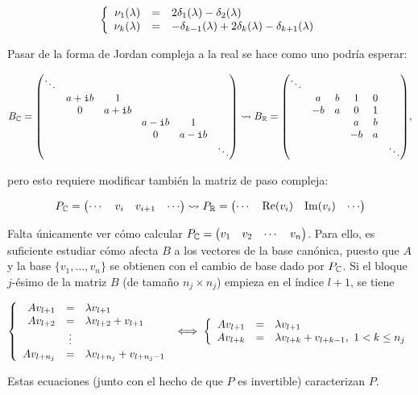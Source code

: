 \documentclass[../ecuaciones_diferenciales.tex]{subfiles}
\begin{document}
\[\left\{
	\begin{array}[ht]{r c l}
		\nu_1(\lambda) & = & 2\delta_1(\lambda) - \delta_2(\lambda)                              \\
		\nu_k(\lambda) & = & -\delta_{k-1}(\lambda) + 2\delta_k(\lambda) - \delta_{k+1}(\lambda)
	\end{array}
	\right.
\]

Pasar de la forma de Jordan compleja a la real se hace como uno podría
esperar:

\[B_\Complex =
	\mat{\ddots &      &      &      &      &         \\
		& a + \iu b & 1    &      &      &         \\
		& 0    & a + \iu b &      &      &         \\
		&      &      & a - \iu b & 1    &         \\
		&      &      & 0    & a - \iu b &         \\
		&      &      &      &      & \ddots} \leadsto
	B_\R =
	\mat{\ddots &    &   &    &      &         \\
		& a  & b & 1  & 0 &         \\
		& -b & a & 0  & 1 &         \\
		&    &   & a  & b &         \\
		&    &   & -b & a &         \\
		&    &   &    &   & \ddots},
\]

pero esto requiere modificar también la matriz de paso compleja:

\[P_{\mathbb{C}} =
	\begin{pmatrix}\cdots & v_i & v_{i+1} & \cdots\end{pmatrix} \leadsto
	P_{\mathbb{R}} =
	\begin{pmatrix}\cdots & \mathrm{Re}(v_i) & \mathrm{Im}(v_i) & \cdots\end{pmatrix}\]

Falta únicamente ver cómo calcular
\(P_{\mathbb{C}} = \begin{pmatrix}v_1 & v_2 & \cdots & v_n\end{pmatrix}\). Para ello, es suficiente
estudiar cómo afecta \(B\) a los vectores de la base canónica, puesto que
\(A\) y la base \(\{v_1, \dots, v_n\}\) se obtienen con el cambio de
base dado por \(P_{\mathbb{C}}\). Si el bloque \(j\)-ésimo de la matriz \(B\) (de
tamaño \(n_j \times n_j\)) empieza en el índice \(l+1\), se tiene

\[\left\{
	\begin{array}[ht]{r c l}
		Av_{l+1}    & =      & \lambda v_{l+1}                 \\
		Av_{l+2}    & =      & \lambda v_{l+2} + v_{l+1}       \\
		            & \vdots &                                 \\
		A v_{l+n_j} & =      & \lambda v_{l+n_j} + v_{l+n_j-1}
	\end{array} \right. \iff
	\left\{
	\begin{array}[ht]{r c l}
		Av_{l+1} & = & \lambda v_{l+1}                               \\
		Av_{l+k} & = & \lambda v_{l+k} + v_{l+k-1}, \ 1 < k \leq n_j \\
	\end{array}
	\right.\]

Estas ecuaciones (junto con el hecho de que \(P\) es invertible)
caracterizan \(P\).
\end{document}
